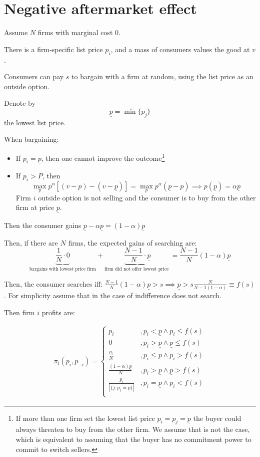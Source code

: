 \documentclass[12pt]{article}
\theoremstyle{plain}
\theoremstyle{plain}
\begin{document}
\section{Negative aftermarket effect}\label{sec:basic1}
 

Assume $N$ firms with marginal cost $0$.

There is a firm-specific list price $p_i$, and a mass of consumers values the good at $v$.

Consumers can pay $s$ to bargain with a firm at random, using the list price as an outside option.


Denote by
\[
\underline{p} = \min\{p_j\}
\]
the lowest list price.


When bargaining:
\begin{itemize}
    \item If $p_i = \underline{p}$, then one cannot improve the outcome\footnote{If more than one firm set the lowest list price $p_i = p_j = \underline{p}$ the buyer could always threaten to buy from the other firm. We assume that is not the case, which is equivalent to assuming that the buyer has no commitment power to commit to switch sellers.  }
    \item If $p_i > P$, then
    \[
    \max_{p} p^\alpha [(v - p) - (v - \underline{p} )] = \max_{p} p^\alpha (\underline{p}  - p) \implies p(\underline{p} ) = \alpha \underline{p} 
    \]
    Firm $i$ outside option is not selling and the consumer is to buy from the other firm at price $\underline{p} $.
\end{itemize}

Then the consumer gains $\underline{p} - \alpha \underline{p}  = (1-\alpha) \underline{p} $


Then, if there are $N$ firms, the expected gains of searching are:
\[
\underbrace{\frac{1}{N} \cdot 0}_{\text{bargains with lowest price firm}} + \underbrace{\frac{N - 1}{N} \cdot \underline{p}}_{\text{firm did not offer lowest price }} = \frac{N - 1}{N}(1 - \alpha)\underline{p}
\]

Then, the consumer searches iff: $\frac{N - 1}{N}(1 - \alpha)\underline{p}> s \implies \underline{p}> s \frac{N}{N-1(1-\alpha)}\equiv f(s)$. For  simplicity assume that in the case of indifference does not search. 

Then firm $i$ profits are: 

\begin{align}
    \pi_i(p_i, p_{-i}) = 
    \begin{cases}
        p_i &, p_i < \underline{p} \land p_i \leq f(s) \\
        0 &, p_i > \underline{p} \land \underline{p} \leq f(s) \\
        \frac{p_i}{N} &, p_i \leq \underline{p} \land p_i > f(s)\\
        \frac{(1-\alpha)\underline{p}}{N} &, p_i > \underline{p} \land \underline{p} > f(s) \\
        \frac{p_i}{|\{j: p_j =\underline{p}\}|} &, p_i = \underline{p} \land p_i < f(s)\\      
    \end{cases}
\end{align}
\end{document}
